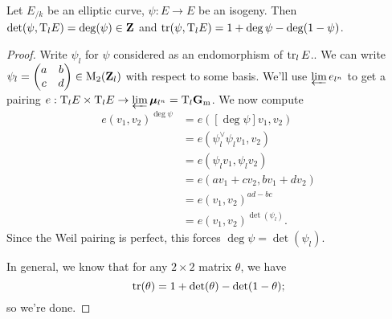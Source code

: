 \begin{proposition}
Let $E_{/k}$ be an elliptic curve, $\psi:E\to E$ be an isogeny. Then 
$\det(\psi,\mathrm{T}_l E) = \deg(\psi)\in \mathbf{Z}$ and 
$\operatorname{tr}(\psi,\mathrm{T}_l E) = 1+\deg\psi-\deg(1-\psi)$. 
\end{proposition}
\begin{proof}
Write $\psi_l$ for $\psi$ considered as an endomorphism of $\operatorname{tr}_l E$.. 
We can write 
$\psi_l=\begin{pmatrix} a & b \\ c & d \end{pmatrix}\in \operatorname{M}_2(\mathbf{Z}_l)$ 
with respect to some basis. We'll use $\varprojlim e_{l^n}$ to get a pairing 
$e:\mathrm{T}_l E\times \mathrm{T}_l E\to \varprojlim {\bm\mu}_{l^n} = \mathrm{T}_l \mathbf{G}_\mathrm{m}$. We now 
compute 
\begin{align*}
  e(v_1,v_2)^{\deg\psi} 
    &= e([\deg\psi]v_1,v_2) \\
    &= e(\psi_l^\vee\psi_l v_1,v_2) \\
    &= e(\psi_l v_1,\psi_l v_2) \\
    &= e(a v_1+c v_2, b v_1+d v_2) \\
    &= e(v_1,v_2)^{a d-b c} \\
    &= e(v_1,v_2)^{\det(\psi_l)} .
\end{align*}
Since the Weil pairing is perfect, this forces $\deg\psi=\det(\psi_l)$. 

In general, we know that for any $2\times 2$ matrix $\theta$, we have 
\begin{equation*}\label{eq:trace-id}
  \operatorname{tr}(\theta)=1+\det(\theta)-\det(1-\theta); 
\end{equation*}
so we're done. 
\end{proof}

